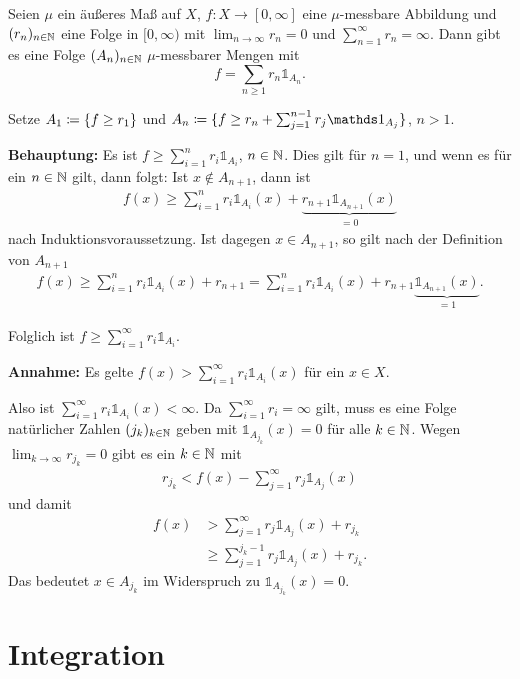 \documentclass[a4paper,twoside,DIV15,BCOR12mm]{scrbook}
\newcommand{\ind}{\mathds 1}
\begin{document}
\begin{satz}
Seien $\mu$ ein äußeres Maß auf $X$, $f: X \to [0,\infty]$ eine $\mu$-messbare Abbildung und $(r_n)_{n\in\mathbb{N}}$ eine Folge in $[0,\infty)$ mit $\lim_{n\to\infty} r_n = 0$ und $\sum_{n=1}^\infty r_n = \infty$. Dann gibt es eine Folge $(A_n)_{n\in\mathbb{N}}$ $\mu$-messbarer Mengen mit
\[
f = \sum_{n\ge1} r_n \ind_{A_n}.
\]
\end{satz}

\begin{beweis}
Setze $A_1 \da \{ f \ge r_1 \}$ und $A_n \da \{f \ge r_n + \sum_{j=1}^{n-1} r_j \ind_{A_j}\}$, $n> 1$.

\textbf{Behauptung:} Es ist $f \ge \sum_{i=1}^n r_i \ind_{A_i}$, $n\in\mathbb{N}$. Dies gilt für $n=1$, und wenn es für ein $n\in\mathbb{N}$ gilt, dann folgt: Ist $x\notin A_{n+1}$, dann ist
\begin{align*}
f(x) \ge \sum_{i=1}^n r_i \ind_{A_i}(x) + \underbrace{r_{n+1}\ind_{A_{n+1}}(x)}_{=0}
\end{align*}
nach Induktionsvoraussetzung. Ist dagegen $x\in A_{n+1}$, so gilt nach der Definition von $A_{n+1}$
\begin{align*}
f(x) \ge \sum_{i=1}^n r_i \ind_{A_i}(x) + r_{n+1} = \sum_{i=1}^n r_i \ind_{A_i}(x) + r_{n+1} \underbrace{\ind_{A_{n+1}}(x)}_{=1}.
\end{align*}

Folglich ist $f\ge \sum_{i=1}^\infty r_i \ind_{A_i}$.

\textbf{Annahme:} Es gelte $f(x) > \sum_{i=1}^\infty r_i \ind_{A_i}(x)$ für ein $x\in X$.

Also ist $\sum_{i=1}^\infty r_i \ind_{A_i}(x)<\infty$. Da $\sum_{i=1}^\infty r_i = \infty$ gilt, muss es eine Folge natürlicher Zahlen $(j_k)_{k\in\mathbb{N}}$ geben mit $\ind_{A_{j_k}}(x)=0$ für alle $k\in\mathbb{N}$.
Wegen $\lim_{k\to\infty} r_{j_k} = 0$ gibt es ein $k\in\mathbb{N}$ mit
\begin{align*}
r_{j_k} < f(x) - \sum_{j=1}^\infty r_j \ind_{A_j}(x)
\end{align*}
und damit 
\begin{align*}
f(x) &> \sum_{j=1}^\infty r_j \ind_{A_j}(x) + r_{j_k} \\
&\ge \sum_{j=1}^{j_k-1} r_j \ind_{A_j}(x) + r_{j_k}.
\end{align*}
Das bedeutet $x\in A_{j_k}$ im Widerspruch zu $\ind_{A_{j_k}}(x) = 0$.
\end{beweis}

\section{Integration}
\end{document}

